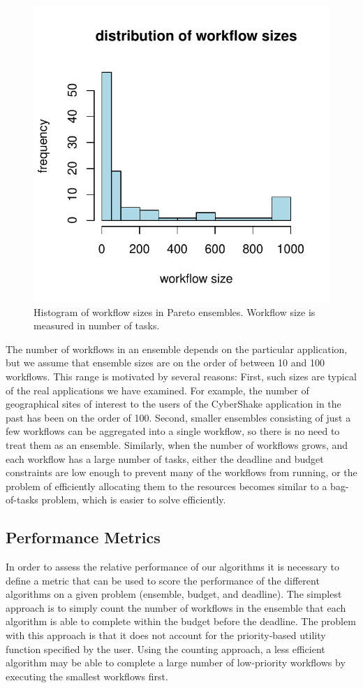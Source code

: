 \documentclass[conference]{IEEEtran}
\begin{document}
\begin{figure}[ht] 
    \centering
    \includegraphics[width=0.6\columnwidth]{figures/ensemble-pareto}
    \caption[Histogram of workflow sizes in Pareto ensembles]{Histogram of workflow sizes in Pareto ensembles. Workflow size is measured in number of tasks.}
    \label{fig:ensemble-pareto}
\end{figure}

The number of workflows in an ensemble depends on the particular application, but we assume that ensemble sizes are on the order of between 10 and 100 workflows. This range is motivated by several reasons: First, such sizes are typical of the real applications we have examined. For example, the number of geographical sites of interest to the users of the CyberShake application in the past has been on the order of 100. Second, smaller ensembles consisting of just a few workflows can be aggregated into a single workflow, so there is no need to treat them as an ensemble. Similarly, when the number of workflows grows, and each workflow has a large number of tasks, either the deadline and budget constraints are low enough to prevent many of the workflows from running, or the problem of efficiently allocating them to the resources becomes similar to a bag-of-tasks problem, which is easier to solve efficiently.


\subsection{Performance Metrics}
\label{sec:perf_metric}

In order to assess the relative performance of our algorithms it is necessary to define a metric that can be used to score the performance of the different algorithms on a given problem (ensemble, budget, and deadline). The simplest approach is to simply count the number of workflows in the ensemble that each algorithm is able to complete within the budget before the deadline. The problem with this approach is that it does not account for the priority-based utility function specified by the user. Using the counting approach, a less efficient algorithm may be able to complete a large number of low-priority workflows by executing the smallest workflows first.
\end{document}
